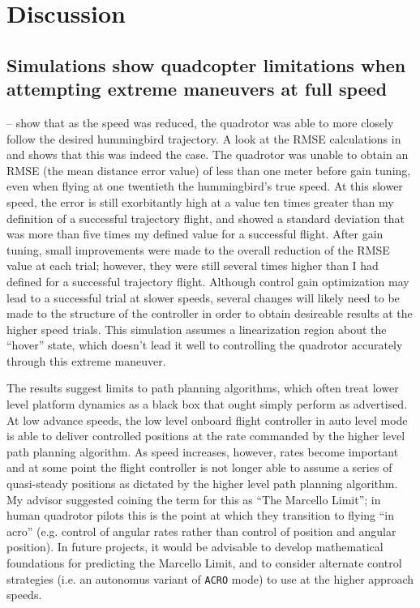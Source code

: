 \section{Discussion}
\label{sec:discussion}

\subsection{Simulations show quadcopter limitations when attempting extreme maneuvers at full speed}
-- show that as the speed was reduced, the quadrotor was able to more closely follow the desired hummingbird trajectory. A look at the RMSE calculations in  and  shows that this was indeed the case. The quadrotor was unable to obtain an RMSE (the mean distance error value) of less than one meter before gain tuning, even when flying at one twentieth the hummingbird's true speed. At this slower speed, the error is still exorbitantly high at a value ten times greater than my definition of a successful trajectory flight, and showed a standard deviation that was more than five times my defined value for a successful flight. After gain tuning, small improvements were made to the overall reduction of the RMSE value at each trial; however, they were still several times higher than I had defined for a successful trajectory flight. Although control gain optimization may lead to a successful trial at slower speeds, several changes will likely need to be made to the structure of the controller in order to obtain desireable results at the higher speed trials. This simulation assumes a linearization region about the ``hover'' state, which doesn't lead it well to controlling the quadrotor accurately through this extreme maneuver.


The results suggest limits to path planning algorithms, which often treat lower level platform dynamics as a black box that ought simply perform as advertised. At low advance speeds, the low level onboard flight controller in auto level mode is able to deliver controlled positions at the rate commanded by the higher level path planning algorithm. As speed increases, however, rates become important and at some point the flight controller is not longer able to assume a series of quasi-steady positions as dictated by the higher level path planning algorithm. My advisor suggested coining the term for this as ``The Marcello Limit''; in human quadrotor pilots this is the point at which they transition to flying ``in acro'' (e.g. control of angular rates rather than control of position and angular position). In future projects, it would be advisable to develop mathematical foundations for predicting the Marcello Limit, and to consider alternate control strategies (i.e. an autonomus variant of \lstinline{ACRO} mode) to use at the higher approach speeds. 




